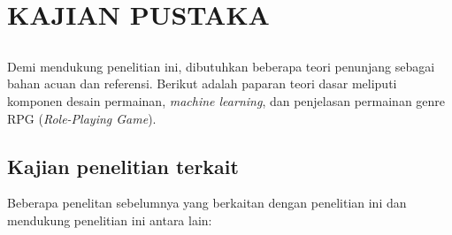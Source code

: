 \chapter{KAJIAN PUSTAKA}
\label{chap:chap2_kajian_pustaka}

\section*{}
Demi mendukung penelitian ini, dibutuhkan beberapa teori penunjang sebagai bahan acuan dan referensi. Berikut adalah paparan teori dasar meliputi komponen desain permainan, \textit{machine learning}, dan penjelasan permainan genre RPG (\textit{Role-Playing Game}).
\vspace{1ex}

\section{Kajian penelitian terkait}
\label{sec:sec2_kajian}
\vspace{1ex}

Beberapa penelitan sebelumnya yang berkaitan dengan penelitian ini dan mendukung penelitian ini antara lain:


